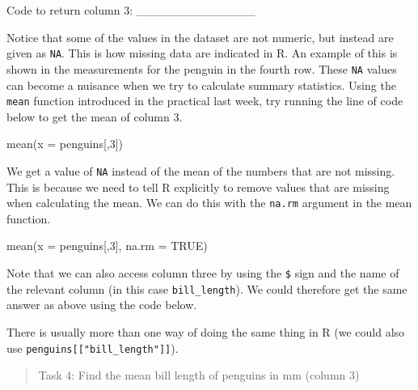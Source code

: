 \documentclass[
]{scrbook}
\newenvironment{Shaded}{\begin{snugshade}}{\end{snugshade}}
\newcommand{\AttributeTok}[1]{\textcolor[rgb]{0.77,0.63,0.00}{#1}}
\newcommand{\ConstantTok}[1]{\textcolor[rgb]{0.00,0.00,0.00}{#1}}
\newcommand{\DecValTok}[1]{\textcolor[rgb]{0.00,0.00,0.81}{#1}}
\newcommand{\FunctionTok}[1]{\textcolor[rgb]{0.00,0.00,0.00}{#1}}
\newcommand{\NormalTok}[1]{#1}
\newcommand{\SpecialCharTok}[1]{\textcolor[rgb]{0.00,0.00,0.00}{#1}}
\begin{document}
Code to return column 3: \_\_\_\_\_\_\_\_\_\_\_\_\_\_

Notice that some of the values in the dataset are not numeric, but instead are given as \texttt{NA}.
This is how missing data are indicated in R.
An example of this is shown in the measurements for the penguin in the fourth row.
These \texttt{NA} values can become a nuisance when we try to calculate summary statistics.
Using the \texttt{mean} function introduced in the practical last week, try running the line of code below to get the mean of column 3.

\begin{Shaded}
\begin{Highlighting}[]
\FunctionTok{mean}\NormalTok{(}\AttributeTok{x =}\NormalTok{ penguins[,}\DecValTok{3}\NormalTok{])}
\end{Highlighting}
\end{Shaded}

We get a value of \texttt{NA} instead of the mean of the numbers that are not missing.
This is because we need to tell R explicitly to remove values that are missing when calculating the mean.
We can do this with the \texttt{na.rm} argument in the mean function.

\begin{Shaded}
\begin{Highlighting}[]
\FunctionTok{mean}\NormalTok{(}\AttributeTok{x =}\NormalTok{ penguins[,}\DecValTok{3}\NormalTok{], }\AttributeTok{na.rm =} \ConstantTok{TRUE}\NormalTok{)}
\end{Highlighting}
\end{Shaded}

Note that we can also access column three by using the \texttt{\$} sign and the name of the relevant column (in this case \texttt{bill\_length}).
We could therefore get the same answer as above using the code below.

\begin{Shaded}
\end{Shaded}

There is usually more than one way of doing the same thing in R (we could also use \texttt{penguins{[}{[}"bill\_length"{]}{]}}).

\begin{quote}
Task 4: Find the mean bill length of penguins in mm (column 3)
\end{quote}
\end{document}
